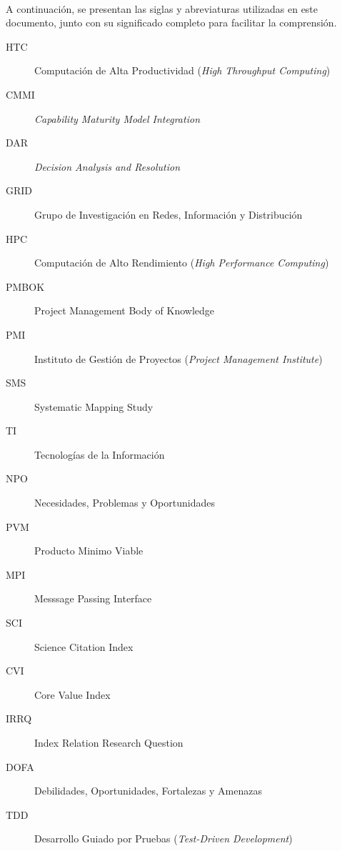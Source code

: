 \label{cap:siglas}
\mbox{}\\
A continuación, se presentan las siglas y abreviaturas utilizadas en este documento, junto con su significado completo para facilitar la comprensión.
\begin{description}
	\item[HTC] Computación de Alta Productividad (\textit{High Throughput Computing})
	\item[CMMI] \textit{Capability Maturity Model Integration}
	\item[DAR] \textit{Decision Analysis and Resolution}
	\item[GRID] Grupo de Investigación en Redes, Información y Distribución
	\item[HPC] Computación de Alto Rendimiento (\textit{High Performance Computing})
	\item[PMBOK] Project Management Body of Knowledge
	\item[PMI] Instituto de Gestión de Proyectos (\textit{Project Management Institute})
	\item[SMS] Systematic Mapping Study
	\item[TI] Tecnologías de la Información
	\item[NPO] Necesidades, Problemas y Oportunidades
	\item[PVM] Producto Minimo Viable
	\item[MPI] Messsage Passing Interface
	\item [SCI] Science Citation Index
	\item [CVI] Core Value Index
	\item [IRRQ] Index Relation Research Question
	\item[DOFA] Debilidades, Oportunidades, Fortalezas y Amenazas
	\item[TDD] Desarrollo Guiado por Pruebas (\textit{Test-Driven Development})
\end{description}
